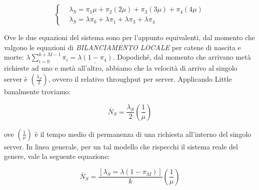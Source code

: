 \[
	\left\{
	\begin{aligned}
	&\lambda_S = \pi_1\mu + \pi_2(2\mu) + \pi_3(3\mu) + \pi_4(4\mu)\\
	&\lambda_S = \lambda\pi_0 + \lambda\pi_1 + \lambda\pi_3 + \lambda\pi_4
	\end{aligned}
	\right.
\]

Ove le due equazioni del sistema sono per l'appunto equivalenti, dal momento che valgono le equazioni di \textit{BILANCIAMENTO LOCALE} per catene di nascita e morte: $\lambda\sum_{i=0}^{k+M-1}{\pi_i} = \underline{\lambda(1-\pi_4)}$. Dopodiché, dal momento che arrivano metà richieste ad uno e metà all'altro, abbiamo che la velocità di arrivo al singolo server è $(\frac{\lambda_S}{2})$, ovvero il relativo throughput per server. Applicando Little banalmente troviamo:

\[
	\bar{N}_S = \frac{\lambda_S}{2}(\frac{1}{\mu})
\]

ove $(\frac{1}{\mu})$ è il tempo medio di permanenza di una richiesta all'interno del singolo server. In linea generale, per un tal modello che rispecchi il sistema reale del genere, vale la seguente equazione:

\[
	\bar{N}_S = \frac{[\lambda_S = \lambda(1-\pi_M)]}{k} (\frac{1}{\mu}) 
\]
